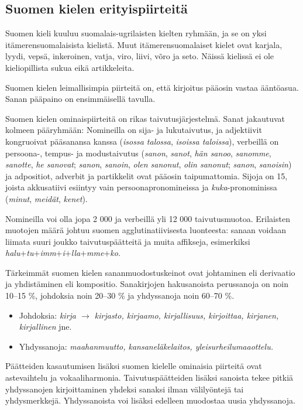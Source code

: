 \documentclass[]{../../metanetpaper}
\begin{document}
\begin{multicols}{2}
\subsection{Suomen kielen erityispiirteitä}


	
Suomen kieli kuuluu suomalais-ugrilaisten kielten ryhmään, ja se on yksi
itämerensuomalaisista kielistä. Muut itämerensuomalaiset kielet ovat karjala,
lyydi, vepsä, inkeroinen, vatja, viro, liivi, võro ja seto. Näissä kielissä ei
ole kieliopillista sukua eikä artikkeleita.

Suomen kielen leimallisimpia piirteitä on, että kirjoitus pääosin vastaa
ääntöasua. Sanan pääpaino on ensimmäisellä tavulla.

Suomen kielen ominaispiirteitä on rikas taivutusjärjestelmä. Sanat jakautuvat
kolmeen pääryhmään: Nomineilla on sija- ja lukutaivutus, ja adjektiivit
kongruoivat pääsanansa kanssa (\textit{isossa talossa}, \textit{isoissa taloissa}), verbeillä on
persoona-, tempus- ja modustaivutus (\textit{sanon}, \textit{sanot}, \textit{hän sanoo}, \textit{sanomme}, \textit{sanotte},
\textit{he sanovat}; \textit{sanon}, \textit{sanoin}, \textit{olen sanonut}, \textit{olin sanonut}; \textit{sanon}, \textit{sanoisin}) ja
adpositiot, adverbit ja partikkelit ovat pääosin taipumattomia. Sijoja on 15,
joista akkusatiivi esiintyy vain persoonapronomineissa ja \textit{kuka}-pronominissa (\textit{minut}, \textit{meidät}, \textit{kenet}).

Nomineilla voi olla jopa 2 000 ja verbeillä yli 12 000 taivutusmuotoa.
Erilaisten muotojen määrä johtuu suomen agglutinatiivisesta luonteesta: sanaan
voidaan liimata suuri joukko taivutuspäätteitä ja muita affikseja, esimerkiksi
\textit{halu}+\textit{tu}+\textit{imm}+\textit{i}+\textit{lla}+\textit{mme}+\textit{ko}.

Tärkeimmät suomen kielen sananmuodostuskeinot ovat johtaminen eli derivaatio ja
yhdistäminen eli kompositio. Sanakirjojen hakusanoista perussanoja on noin
10–15 \%, johdoksia noin 20–30 \% ja yhdyssanoja noin 60–70 \%.
\begin{itemize}
\item Johdoksia: \textit{kirja $\to$ kirjasto, kirjaamo, kirjallisuus, kirjoittaa, kirjanen,
    kirjallinen} jne.

\item Yhdyssanoja: \textit{maahanmuutto, kansaneläkelaitos, yleisurheilumaaottelu.}
\end{itemize}
Päätteiden kasautumisen lisäksi suomen kielelle ominaisia piirteitä ovat
astevaihtelu ja vokaaliharmonia. Taivutuspäätteiden lisäksi sanoista tekee
pitkiä yhdyssanojen kirjoittaminen yhdeksi sanaksi ilman välilyöntejä tai
yhdysmerkkejä. Yhdyssanoista voi lisäksi edelleen muodostaa uusia yhdyssanoja.


\end{multicols}
\end{document}
